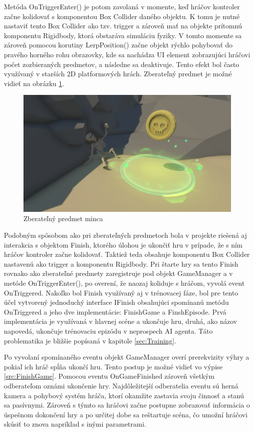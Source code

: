 \documentclass[slovak, master]{diploma}
\begin{document}
Metóda OnTriggerEnter() je potom zavolaná v momente, keď hráčov kontroler začne kolidovať s komponentou Box Collider daného objektu. K tomu je nutné nastaviť tento Box Collider ako tzv. trigger a zároveň mať na objekte prítomnú komponentu Rigidbody, ktorá obstaráva simuláciu fyziky. V tomto momente sa zároveň pomocou korutiny LerpPosition() začne objekt rýchlo pohybovať do pravého horného rohu obrazovky, kde sa nachádza UI element zobrazujúci hráčovi počet zozbieraných predmetov, a následne sa deaktivuje. Tento efekt bol často využívaný v starších 2D platformových hrách. Zberateľný predmet je možné vidieť na obrázku \ref{pic:Pickup}.

\begin{figure}[!htbp]
    \centering
    \includegraphics[width=.9\textwidth]{Figures/pickup.png}
    \caption{Zberateľný predmet minca}
    \label{pic:Pickup}
\end{figure}

Podobným spôsobom ako pri zberateľných predmetoch bola v projekte riešená aj interakcia s objektom Finish, ktorého úlohou je ukončiť hru v prípade, že s ním hráčov kontroler začne kolidovať. Taktiež teda obsahuje komponentu Box Collider nastavenú ako trigger a komponentu Rigidbody. Pri štarte hry sa tento Finish rovnako ako zberateľné predmety zaregistruje pod objekt GameManager a v metóde \mbox{OnTriggerEnter()}, po overení, že naozaj koliduje s hráčom, vyvolá event \mbox{OnTriggered}. Nakoľko bol Finish využívaný aj v trénovacej fáze, bol pre tento účel vytvorený jednoduchý interface IFinish obsahujúci spomínanú metódu OnTriggered a jeho dve implementácie: FinishGame a FinshEpisode. Prvá implementácia je využívaná v hlavnej scéne a ukončuje hru, druhá, ako názov napovedá, ukončuje trénovaciu epizódu v neprospech AI agenta. Táto problematika je bližšie popísaná v kapitole \ref{sec:Training}.

Po vyvolaní spomínaného eventu objekt GameManager overí prerekvizity výhry a pokiaľ ich hráč spĺňa ukončí hru. Tento postup je možné vidieť vo výpise \ref{src:FinishGame}. Pomocou eventu OnGameFinished zároveň všetkým odberateľom oznámi ukončenie hry. Najdôležitejší odberatelia eventu sú herná kamera a pohybový systém hráča, ktorí okamžite zastavia svoju činnosť a stanú sa pasívnymi. Zároveň s týmto sa hráčovi začne postupne zobrazovať informácia o úspešnom dokončení hry a po určitej dobe sa reštartuje scéna, čo umožní hráčovi skúsiť to znova napríklad s inými parametrami.
\end{document}

